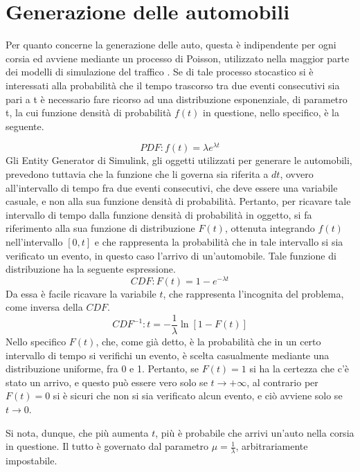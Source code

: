 \newpage
\section{Generazione delle automobili}
Per quanto concerne la generazione delle auto, questa è indipendente per ogni corsia ed avviene mediante un processo di Poisson, utilizzato nella maggior parte dei modelli di simulazione del traffico \cite{probability}. Se di tale processo stocastico si è interessati alla probabilità che il tempo trascorso tra due eventi consecutivi sia pari a t è necessario fare ricorso ad una distribuzione esponenziale, di parametro t, la cui funzione densità di probabilità $ f(t)$ in questione, nello specifico, è la seguente.

\begin{equation}
PDF: f(t) = \lambda e^{\lambda t}
\end{equation}
Gli Entity Generator di Simulink, gli oggetti utilizzati per generare le automobili, prevedono tuttavia che la funzione che li governa sia riferita a $dt$, ovvero all’intervallo di tempo fra due eventi consecutivi, che deve essere una variabile casuale, e non alla sua funzione densità di probabilità. Pertanto, per ricavare tale intervallo di tempo dalla funzione densità di probabilità in oggetto, si fa riferimento alla sua funzione di distribuzione $F(t)$, ottenuta integrando $f(t)$ nell'intervallo $[0, t]$ e che rappresenta la probabilità che in tale intervallo si sia verificato un evento, in questo caso l’arrivo di un’automobile. Tale funzione di distribuzione ha la seguente espressione.
\begin{equation}
CDF: F(t)  = 1-e^{-\lambda t}
\end{equation}
Da essa è facile ricavare la variabile $t$, che rappresenta l’incognita del problema, come inversa della $CDF$.
\begin{equation}
CDF^{-1}: t = -\frac{1}{\lambda} \ln{[1 - F(t)]}
\end{equation}
Nello specifico $F(t)$, che, come già detto, è la probabilità che in un certo intervallo di tempo si verifichi un evento, è scelta casualmente mediante una distribuzione uniforme, fra 0 e 1. Pertanto, se $F(t)=1$ si ha la certezza che c’è stato un arrivo, e questo può essere vero solo se $t \to +\infty$, al contrario per $F(t)=0$ si è sicuri che non si sia verificato alcun evento, e ciò avviene solo se $t \to 0$.

Si nota, dunque, che più aumenta $t$, più è probabile che arrivi un’auto nella corsia in questione. Il tutto è governato dal parametro $\mu = \frac{1}{\lambda}$, arbitrariamente impostabile.

